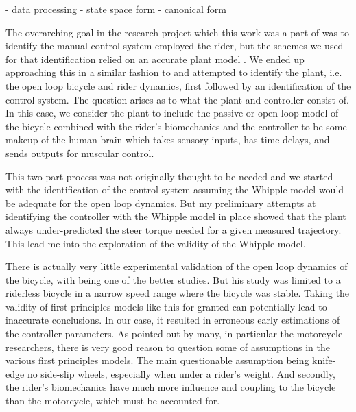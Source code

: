 \documentclass[a4paper]{article}
\begin{document}
- data processing
- state space form
- canonical form

The overarching goal in the research project which this work was a part of was
to identify the manual control system employed the rider, but the schemes we
used for that identification relied on an accurate plant model
\cite{Moore2012}. We ended up approaching this in a similar fashion to
\cite{Eaton1973} and attempted to identify the plant, i.e. the open loop
bicycle and rider dynamics, first followed by an identification of the control
system. The question arises as to what the plant and controller consist of. In
this case, we consider the plant to include the passive or open loop model of
the bicycle combined with the rider's biomechanics and the controller to be
some makeup of the human brain which takes sensory inputs, has time delays, and
sends outputs for muscular control.

This two part process was not originally thought to be needed and we started
with the identification of the control system assuming the Whipple model would
be adequate for the open loop dynamics. But my preliminary attempts at
identifying the controller with the Whipple model in place showed that the
plant always under-predicted the steer torque needed for a given measured
trajectory. This lead me into the exploration of the validity of the Whipple
model.

There is actually very little experimental validation of the open loop dynamics
of the bicycle, with \cite{Kooijman2006} being one of the better studies. But
his study was limited to a riderless bicycle in a narrow speed range where the
bicycle was stable. Taking the validity of first principles models like this
for granted can potentially lead to inaccurate conclusions. In our case, it
resulted in erroneous early estimations of the controller parameters. As
pointed out by many, in particular the motorcycle researchers, there is very
good reason to question some of assumptions in the various first principles
models. The main questionable assumption being knife-edge no side-slip wheels,
especially when under a rider's weight.  And secondly, the rider's biomechanics
have much more influence and coupling to the bicycle than the motorcycle, which
must be accounted for.
\end{document}
